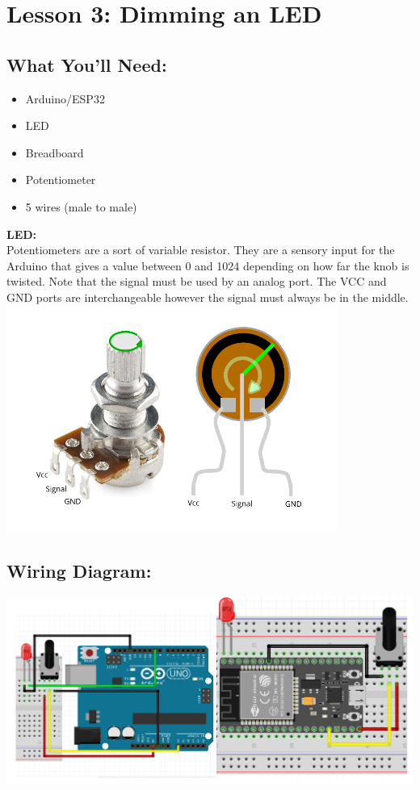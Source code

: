\documentclass[a4paper,12pt]{report}
\newcommand{\diagramWidth}{150mm}
\begin{document}
\newpage
\section*{Lesson 3: Dimming an LED}
    \subsection*{What You'll Need:}
            \begin{itemize}
                \item Arduino/ESP32
                \item LED
                \item Breadboard
                \item Potentiometer
                \item 5 wires (male to male)
            \end{itemize}
        \begin{mdframed}[linewidth = 3, linecolor = turbo_purple]
            \textbf{LED:}
            \\
            Potentiometers are a sort of variable resistor. They are a sensory input for the Arduino that gives a value between 0 and 1024 depending on how far the knob is twisted. Note that the signal must be used by an analog port. The VCC and GND ports are interchangeable however the signal must always be in the middle. \\
            \includegraphics[scale = 1]{Assets/pot.png}
        \end{mdframed}
    \subsection*{Wiring Diagram:}
    \includegraphics[width = \diagramWidth]{Assets/arduino_esp_pot.png}
\newpage
\end{document}
